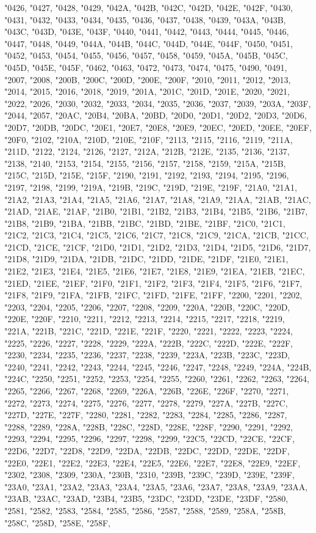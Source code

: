 "0426, "0427, "0428, "0429, "042A, "042B, "042C, "042D, "042E, "042F, "0430, "0431, "0432, "0433, "0434, "0435, "0436, "0437, "0438, "0439, "043A, "043B, "043C, "043D, "043E, "043F, "0440, "0441, "0442, "0443, "0444, "0445, "0446, "0447, "0448, "0449, "044A, "044B, "044C, "044D, "044E, "044F, "0450, "0451, "0452, "0453, "0454, "0455, "0456, "0457, "0458, "0459, "045A, "045B, "045C, "045D, "045E, "045F, "0462, "0463, "0472, "0473, "0474, "0475, "0490, "0491, "2007, "2008, "200B, "200C, "200D, "200E, "200F, "2010, "2011, "2012, "2013, "2014, "2015, "2016, "2018, "2019, "201A, "201C, "201D, "201E, "2020, "2021, "2022, "2026, "2030, "2032, "2033, "2034, "2035, "2036, "2037, "2039, "203A, "203F, "2044, "2057, "20AC, "20B4, "20BA, "20BD, "20D0, "20D1, "20D2, "20D3, "20D6, "20D7, "20DB, "20DC, "20E1, "20E7, "20E8, "20E9, "20EC, "20ED, "20EE, "20EF, "20F0, "2102, "210A, "210D, "210E, "210F, "2113, "2115, "2116, "2119, "211A, "211D, "2122, "2124, "2126, "2127, "212A, "212B, "212E, "2135, "2136, "2137, "2138, "2140, "2153, "2154, "2155, "2156, "2157, "2158, "2159, "215A, "215B, "215C, "215D, "215E, "215F, "2190, "2191, "2192, "2193, "2194, "2195, "2196, "2197, "2198, "2199, "219A, "219B, "219C, "219D, "219E, "219F, "21A0, "21A1, "21A2, "21A3, "21A4, "21A5, "21A6, "21A7, "21A8, "21A9, "21AA, "21AB, "21AC, "21AD, "21AE, "21AF, "21B0, "21B1, "21B2, "21B3, "21B4, "21B5, "21B6, "21B7, "21B8, "21B9, "21BA, "21BB, "21BC, "21BD, "21BE, "21BF, "21C0, "21C1, "21C2, "21C3, "21C4, "21C5, "21C6, "21C7, "21C8, "21C9, "21CA, "21CB, "21CC, "21CD, "21CE, "21CF, "21D0, "21D1, "21D2, "21D3, "21D4, "21D5, "21D6, "21D7, "21D8, "21D9, "21DA, "21DB, "21DC, "21DD, "21DE, "21DF, "21E0, "21E1, "21E2, "21E3, "21E4, "21E5, "21E6, "21E7, "21E8, "21E9, "21EA, "21EB, "21EC, "21ED, "21EE, "21EF, "21F0, "21F1, "21F2, "21F3, "21F4, "21F5, "21F6, "21F7, "21F8, "21F9, "21FA, "21FB, "21FC, "21FD, "21FE, "21FF, "2200, "2201, "2202, "2203, "2204, "2205, "2206, "2207, "2208, "2209, "220A, "220B, "220C, "220D, "220E, "220F, "2210, "2211, "2212, "2213, "2214, "2215, "2217, "2218, "2219, "221A, "221B, "221C, "221D, "221E, "221F, "2220, "2221, "2222, "2223, "2224, "2225, "2226, "2227, "2228, "2229, "222A, "222B, "222C, "222D, "222E, "222F, "2230, "2234, "2235, "2236, "2237, "2238, "2239, "223A, "223B, "223C, "223D, "2240, "2241, "2242, "2243, "2244, "2245, "2246, "2247, "2248, "2249, "224A, "224B, "224C, "2250, "2251, "2252, "2253, "2254, "2255, "2260, "2261, "2262, "2263, "2264, "2265, "2266, "2267, "2268, "2269, "226A, "226B, "226E, "226F, "2270, "2271, "2272, "2273, "2274, "2275, "2276, "2277, "2278, "2279, "227A, "227B, "227C, "227D, "227E, "227F, "2280, "2281, "2282, "2283, "2284, "2285, "2286, "2287, "2288, "2289, "228A, "228B, "228C, "228D, "228E, "228F, "2290, "2291, "2292, "2293, "2294, "2295, "2296, "2297, "2298, "2299, "22C5, "22CD, "22CE, "22CF, "22D6, "22D7, "22D8, "22D9, "22DA, "22DB, "22DC, "22DD, "22DE, "22DF, "22E0, "22E1, "22E2, "22E3, "22E4, "22E5, "22E6, "22E7, "22E8, "22E9, "22EF, "2302, "2308, "2309, "230A, "230B, "2310, "239B, "239C, "239D, "239E, "239F, "23A0, "23A1, "23A2, "23A3, "23A4, "23A5, "23A6, "23A7, "23A8, "23A9, "23AA, "23AB, "23AC, "23AD, "23B4, "23B5, "23DC, "23DD, "23DE, "23DF, "2580, "2581, "2582, "2583, "2584, "2585, "2586, "2587, "2588, "2589, "258A, "258B, "258C, "258D, "258E, "258F, 